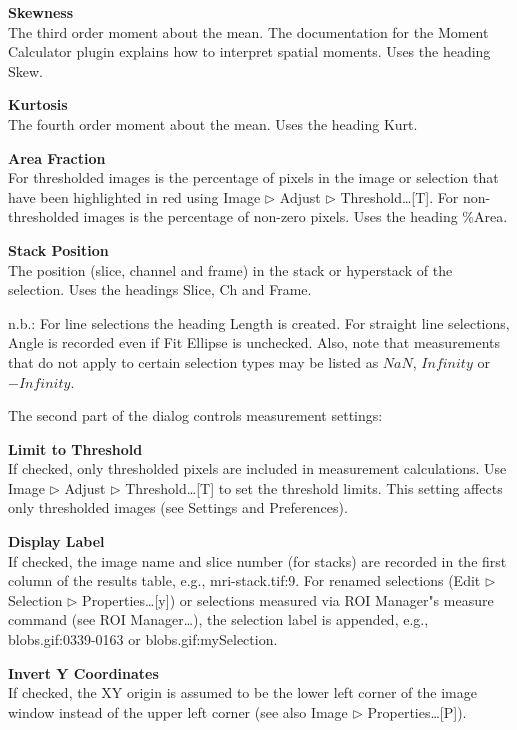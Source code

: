 \textbf{Skewness}\\The third order moment about the mean. The
documentation for the Moment Calculator plugin explains how to
interpret spatial moments. Uses the heading Skew.

\textbf{Kurtosis}\\The fourth order moment about the mean. Uses the
heading Kurt.

\textbf{Area Fraction}\\For thresholded images is the percentage of
pixels in the image or selection that have been highlighted in red
using Image ${\triangleright}$ Adjust ${\triangleright}$
Threshold\ldots [T]. For non-thresholded images is the percentage of
non-zero pixels. Uses the heading \%Area.

\textbf{Stack Position}\\The position (slice, channel and frame) in
the stack or hyperstack of the selection. Uses the headings Slice, Ch
and Frame.

n.b.: For line selections the heading Length is created. For straight
line selections, Angle is recorded even if Fit Ellipse is unchecked.
Also, note that measurements that do not apply to certain selection
types may be listed as $NaN$, 
$Infinity$ or $-Infinity$.

The second part of the dialog controls measurement settings:

\textbf{Limit to Threshold}\\If checked, only thresholded pixels
are included in measurement calculations. Use Image ${\triangleright}$
Adjust ${\triangleright}$ Threshold\ldots [T] to set the threshold
limits. This setting affects only thresholded images (see Settings and
Preferences).

\textbf{Display Label}\\If checked, the image name and slice number
(for stacks) are recorded in the first column of the results table,
e.g., mri-stack.tif:9. For renamed selections (Edit ${\triangleright}$
Selection ${\triangleright}$ Properties\ldots [y]) or selections
measured via ROI Manager"s measure command (see ROI
Manager\ldots), the selection label is appended, e.g.,
blobs.gif:0339-0163 or blobs.gif:mySelection.


\textbf{Invert Y Coordinates}\\If checked, the XY origin is assumed
to be the lower left corner of the image window instead of the upper
left corner (see also Image ${\triangleright}$ Properties\ldots [P]).

